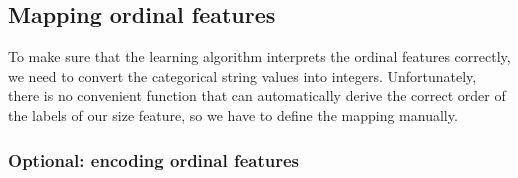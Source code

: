 \subsection{Mapping ordinal features}
To make sure that the learning algorithm interprets the ordinal features correctly, we need to convert the categorical string values into integers. Unfortunately, there is no convenient function that can automatically derive the correct order of the labels of our size feature, so we have to define the mapping manually.
\subsubsection*{Optional: encoding ordinal features}
